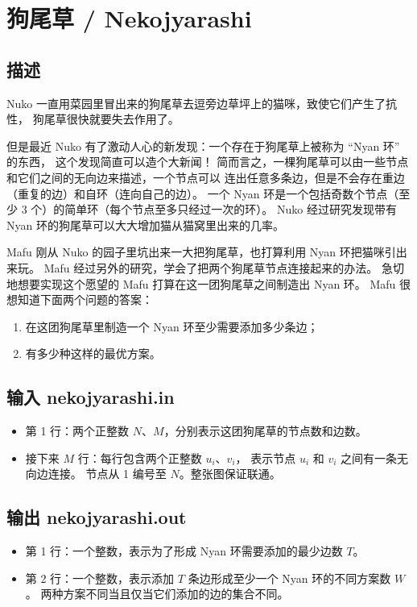 \documentclass[UTF8, 11pt, a4paper]{article}
\begin{document}
\section*{狗尾草 / Nekojyarashi}

\subsection*{描述}
Nuko 一直用菜园里冒出来的狗尾草去逗旁边草坪上的猫咪，致使它们产生了抗性，%
狗尾草很快就要失去作用了。

但是最近 Nuko 有了激动人心的新发现：一个存在于狗尾草上被称为 “Nyan 环” 的东西，%
这个发现简直可以造个大新闻！%
简而言之，一棵狗尾草可以由一些节点和它们之间的无向边来描述，一个节点可以%
连出任意多条边，但是不会存在重边（重复的边）和自环（连向自己的边）。%
一个 Nyan 环是一个包括奇数个节点（至少 3 个）的简单环（每个节点至多只经过一次的环）。%
Nuko 经过研究发现带有 Nyan 环的狗尾草可以大大增加猫从猫窝里出来的几率。

Mafu 刚从 Nuko 的园子里坑出来一大把狗尾草，也打算利用 Nyan 环把猫咪引出来玩。%
Mafu 经过另外的研究，学会了把两个狗尾草节点连接起来的办法。%
急切地想要实现这个愿望的 Mafu 打算在这一团狗尾草之间制造出 Nyan 环。%
Mafu 很想知道下面两个问题的答案：
\begin{enumerate}
    \item 在这团狗尾草里制造一个 Nyan 环至少需要添加多少条边；
    \item 有多少种这样的最优方案。
\end{enumerate}

\subsection*{输入 \makebox[0.5em]{} \small{nekojyarashi.in}}
\begin{itemize}
    \item 第 1 行：两个正整数 $N$、$M$，分别表示这团狗尾草的节点数和边数。
    \item 接下来 $M$ 行：每行包含两个正整数 $u_i$、$v_i$，%
        表示节点 $u_i$ 和 $v_i$ 之间有一条无向边连接。%
        节点从 1 编号至 $N$。整张图保证联通。
\end{itemize}

\subsection*{输出 \makebox[0.5em]{} \small{nekojyarashi.out}}
\begin{itemize}
    \item 第 1 行：一个整数，表示为了形成 Nyan 环需要添加的最少边数 $T$。
    \item 第 2 行：一个整数，表示添加 $T$ 条边形成至少一个 Nyan 环的不同方案数 $W$。
        两种方案不同当且仅当它们添加的边的集合不同。
\end{itemize}
\end{document}
